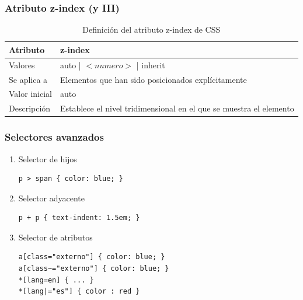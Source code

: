 \documentclass[ucs]{beamer}
\begin{document}
\begin{frame}
\frametitle{Atributo z-index (y III)}

\begin{center}
  \begin{table}
   \begin{tabular}{p{1.8cm}p{7.8cm}}
Atributo & \bf{z-index} \\ \hline
Valores& auto | $<numero>$ | inherit \\ \hline
Se aplica a& Elementos que han sido posicionados explícitamente \\ \hline
Valor inicial& auto \\ \hline
Descripción& Establece el nivel tridimensional en el que se muestra el elemento \\ \hline
  \end{tabular}
   \caption{Definición del atributo z-index de CSS}
 \end{table}
\end{center}


\end{frame}


\begin{frame}[fragile]
\frametitle{Selectores avanzados}

\begin{enumerate}
  \item Selector de hijos
\begin{verbatim}
p > span { color: blue; }
\end{verbatim}
  \item Selector adyacente
\begin{verbatim}
p + p { text-indent: 1.5em; }
\end{verbatim}
  \item Selector de atributos
\begin{verbatim}
a[class="externo"] { color: blue; }
a[class~="externo"] { color: blue; }
*[lang=en] { ... }
*[lang|="es"] { color : red }
\end{verbatim}
\end{enumerate}

\end{frame}



\end{document}
